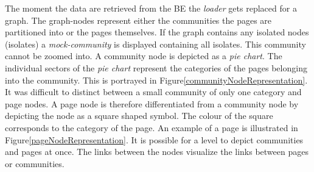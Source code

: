 The moment the data are retrieved from the BE the \textit{loader} gets replaced for a graph. The graph-nodes represent either the communities the pages are partitioned into or the pages themselves.  If the graph contains any isolated nodes (isolates) a \textit{mock-community} is displayed containing all isolates. This community cannot be zoomed into. A community node is depicted as a \textit{pie chart}. The individual sectors of the \textit{pie chart} represent the categories of the pages belonging into the community. This is portrayed in Figure\ref{communityNodeRepresentation}. It was difficult to distinct between a small community of only one category and page nodes. A page node is therefore differentiated from a community node by depicting the node as a square shaped symbol. The colour of the square corresponds to the category of the page. An example of a page is illustrated in Figure\ref{pageNodeRepresentation}. It is possible for a level to depict communities and pages at once. The links between the nodes visualize the links between pages or communities. 

